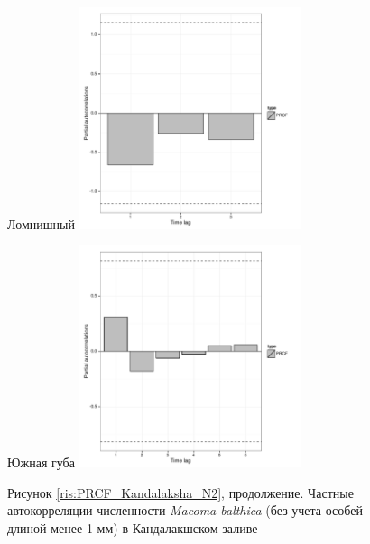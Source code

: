 \documentclass[12pt, a4paper]{disser}
\begin{document}
\begin{figure}[ht]
	\begin{minipage}[b]{.46\linewidth}
	\begin{center}
	{\tiny Ломнишный}
	\includegraphics[width=65mm]{../White_Sea/dynamic_N_N1/PRCF_Lomnishniy_.pdf}
	\end{center}
	\end{minipage}
%
	\hfil %
%
	\begin{minipage}[b]{.46\linewidth}
	\begin{center}
	{\tiny Южная губа}
	\includegraphics[width=65mm]{../White_Sea/dynamic_N_N1/PRCF_YuG_.pdf}
	\end{center}
	\end{minipage}

\begin{center}
Рисунок \ref{ris:PRCF_Kandalaksha_N2}, продолжение. Частные автокорреляции численности {\it Macoma balthica} (без учета особей длиной менее 1 мм) в Кандалакшском заливе
\end{center}
	\end{figure}
\end{document}
